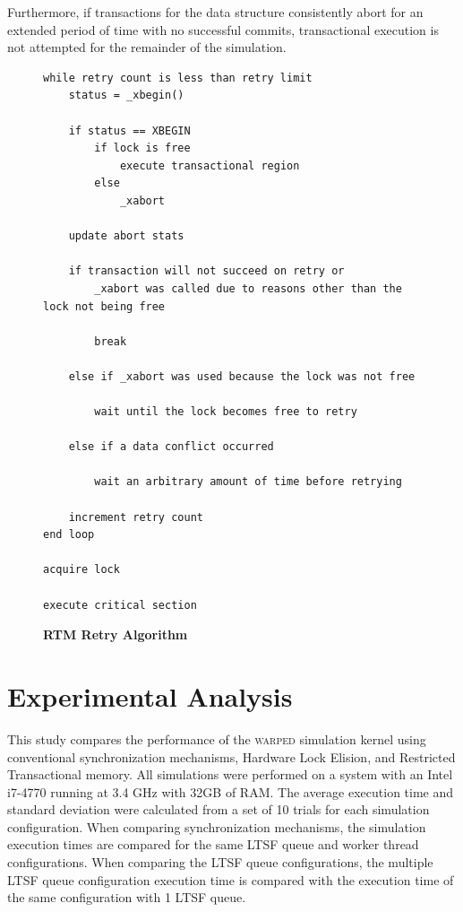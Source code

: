 \documentclass[11pt]{book}
\begin{document}
Furthermore, if transactions for the data structure consistently abort for an extended
period of time with no successful commits, transactional execution is not attempted for
the remainder of the simulation.

\begin{figure}
\begin{verbatim}
while retry count is less than retry limit
    status = _xbegin()

    if status == XBEGIN
        if lock is free
            execute transactional region
        else
            _xabort

    update abort stats

    if transaction will not succeed on retry or 
        _xabort was called due to reasons other than the lock not being free

        break

    else if _xabort was used because the lock was not free

        wait until the lock becomes free to retry

    else if a data conflict occurred
        
        wait an arbitrary amount of time before retrying

    increment retry count
end loop

acquire lock

execute critical section
\end{verbatim}
\caption{\textbf{RTM Retry Algorithm}}\label{rtm_retry}
\end{figure}

\chapter{Experimental Analysis}

This study compares the performance of the \textsc{warped} simulation kernel
using conventional synchronization mechanisms, Hardware Lock Elision, and
Restricted Transactional memory.  All simulations were performed on a system
with an Intel i7-4770 running at 3.4 GHz with 32GB of RAM.  The average
execution time and standard deviation were calculated from a set of 10 trials
for each simulation configuration.  When comparing synchronization mechanisms,
the simulation execution times are compared for the same LTSF queue and worker thread
configurations.  When comparing the LTSF queue configurations, the multiple
LTSF queue configuration execution time is compared with the execution time of the same
configuration with 1 LTSF queue.
\end{document}
